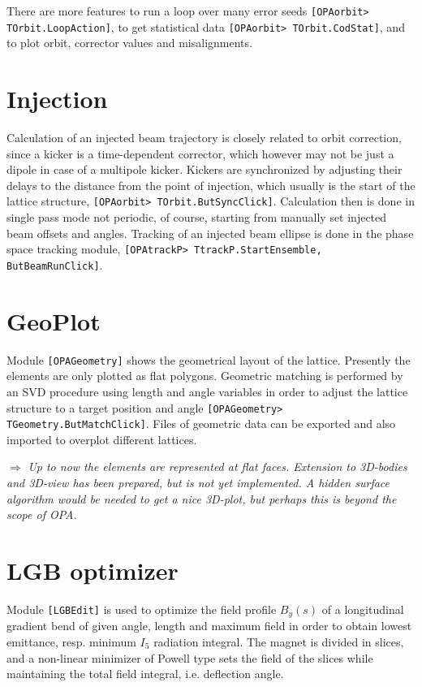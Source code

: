 \documentclass[12pt]{article}
\newcommand\todo[1]{$\Longrightarrow$ {\em #1} }
\newcommand\code[1]{{\tt [#1]}}
\begin{document}
There are more features to run a loop over many error seeds \code{OPAorbit> TOrbit.LoopAction}, to get statistical data \code{OPAorbit> TOrbit.CodStat}, and to plot orbit, corrector values and misalignments.

\section{Injection}

Calculation of an injected beam trajectory is closely related to orbit correction, since a kicker is a time-dependent corrector, which however may not be just a dipole in case of a multipole kicker.
Kickers are synchronized by adjusting their delays to the distance from the point of injection, which usually is the start of the lattice structure, \code{OPAorbit> TOrbit.ButSyncClick}. Calculation then is done in single pass mode not periodic, of course, starting from manually set injected beam offsets and angles.
Tracking of an injected beam ellipse is done in the phase space tracking module, \code{OPAtrackP> TtrackP.StartEnsemble, ButBeamRunClick}.

\section{GeoPlot}
Module \code{OPAGeometry} shows the geometrical layout of the lattice. Presently the elements are only plotted as flat polygons. Geometric matching is performed by an SVD procedure using length and angle variables in order to adjust the lattice structure to a target position and angle \code{OPAGeometry> TGeometry.ButMatchClick}. Files of geometric data can be exported and also imported to overplot different lattices.

\todo{Up to now the elements are represented at flat faces. Extension to 3D-bodies and 3D-view has been prepared, but is not yet implemented. A hidden surface algorithm would be needed to get a nice 3D-plot, but perhaps this is beyond the scope of OPA.}

\section{LGB optimizer}
Module \code{LGBEdit} is used to optimize the field profile $B_y(s)$ of a longitudinal gradient bend of given angle, length and maximum field in order to obtain lowest emittance, resp. minimum $I_5$ radiation integral. The magnet is divided in slices, and a non-linear minimizer of Powell type \cite{numrec} sets the field of the slices while maintaining the total field integral, i.e. deflection angle.
\end{document}
